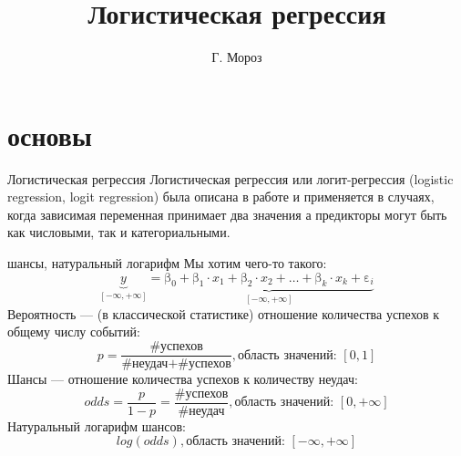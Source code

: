 
\usepackage{subfig}
\newcommand{\mcrot}[4]{\multicolumn{#1}{#2}{\rlap{\rotatebox{#3}{#4}~}}} 
\title[]{Логистическая регрессия}
\author[]{Г. Мороз}
\date{}

\frame{\titlepage}
\section{основы}
\begin{frame}{Логистическая регрессия}
Логистическая регрессия или логит-регрессия (logistic regression, logit regression) была описана в работе \citep{cox58} и применяется в случаях, когда зависимая переменная принимает два значения а предикторы могут быть как числовыми, так и категориальными.
\end{frame}
\begin{frame}{шансы, натуральный логарифм}
\vspace{-2mm}
Мы хотим чего-то такого:
$$\underbrace{y}_{[-\infty, +\infty]}=\underbrace{\mbox{β}_0+\mbox{β}_1\cdot x_1+\mbox{β}_2\cdot x_2 + \dots +\mbox{β}_k\cdot x_k +\mbox{ε}_i}_{[-\infty, +\infty]}$$
Вероятность — (в классической статистике) отношение количества успехов к общему числу событий:
$$p = \frac{\mbox{\# успехов}}{\mbox{\# неудач} + \mbox{\# успехов}}, \mbox{область значений: }[0, 1]$$
Шансы — отношение количества успехов к количеству неудач:
$$odds = \frac{p}{1-p} = \frac{\mbox{\# успехов}}{\mbox{\# неудач}}, \mbox{область значений: }[0, +\infty]$$
Натуральный логарифм шансов:
$$log(odds), \mbox{область значений: }[-\infty, +\infty]$$
\end{frame}
